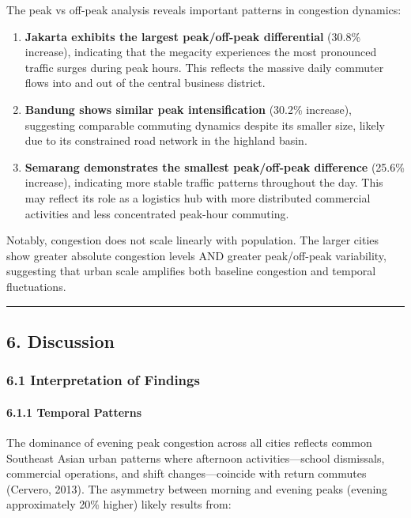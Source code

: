 The peak vs off-peak analysis reveals important patterns in congestion dynamics:

\begin{enumerate}
\def\labelenumi{\arabic{enumi}.}
\item
  \textbf{Jakarta exhibits the largest peak/off-peak differential} (30.8\% increase), indicating that the megacity experiences the most pronounced traffic surges during peak hours. This reflects the massive daily commuter flows into and out of the central business district.
\item
  \textbf{Bandung shows similar peak intensification} (30.2\% increase), suggesting comparable commuting dynamics despite its smaller size, likely due to its constrained road network in the highland basin.
\item
  \textbf{Semarang demonstrates the smallest peak/off-peak difference} (25.6\% increase), indicating more stable traffic patterns throughout the day. This may reflect its role as a logistics hub with more distributed commercial activities and less concentrated peak-hour commuting.
\end{enumerate}

Notably, congestion does not scale linearly with population. The larger cities show greater absolute congestion levels AND greater peak/off-peak variability, suggesting that urban scale amplifies both baseline congestion and temporal fluctuations.

\begin{center}\rule{0.5\linewidth}{0.5pt}\end{center}

\subsection{6. Discussion}\label{discussion}

\subsubsection{6.1 Interpretation of Findings}\label{interpretation-of-findings}

\paragraph{6.1.1 Temporal Patterns}\label{temporal-patterns-1}

The dominance of evening peak congestion across all cities reflects common Southeast Asian urban patterns where afternoon activities---school dismissals, commercial operations, and shift changes---coincide with return commutes (Cervero, 2013). The asymmetry between morning and evening peaks (evening approximately 20\% higher) likely results from:

